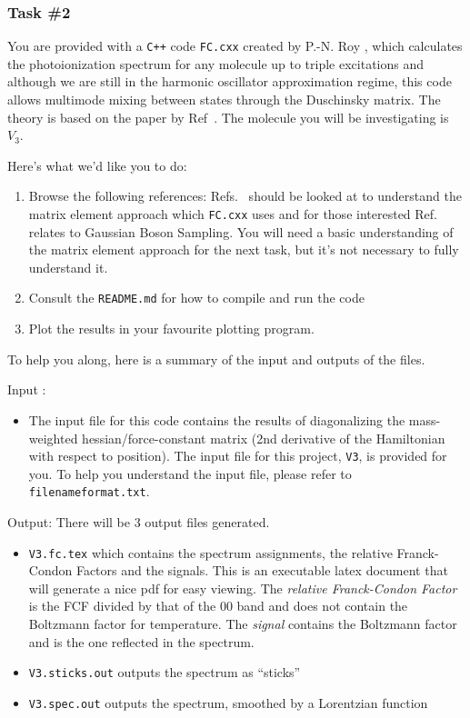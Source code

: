 \documentclass[12pt]{article}
\begin{document}
\subsubsection*{Task \#2}

You are provided with a \texttt{C++} code \texttt{FC.cxx} created by P.-N. Roy \cite{yang1995structure}, which calculates the photoionization spectrum for any molecule up to triple excitations and although we are still in the harmonic oscillator approximation regime, this code allows multimode mixing between states through the Duschinsky matrix. The theory is based on the paper by Ref~\cite{doktorov1977dynamical}. The molecule you will be investigating is $V_3$.

Here's what we'd like you to do:
\begin{enumerate}
    \item Browse the following references: Refs.~\cite{yang1995structure,jankowiak2007vibronic} should be looked at to understand the matrix element approach which \texttt{FC.cxx} uses and for those interested Ref.~\cite{quesadaFranckCondonFactorsCounting2019} relates to Gaussian Boson Sampling. You will need a basic understanding of the matrix element approach for the next task, but it's not necessary to fully understand it.
    \item Consult the \texttt{README.md} for how to compile and run the code
     \item Plot the results in your favourite plotting program. 
\end{enumerate}

\noindent To help you along, here is a summary of the input and outputs of the files.

\noindent Input :
\begin{itemize}
\item  The input file for this code contains the results of diagonalizing the mass-weighted hessian/force-constant matrix (2nd derivative of the Hamiltonian with respect to position). The input file for this project, \texttt{V3}, is provided for you. To help you understand the input file, please refer to \texttt{filenameformat.txt}. 
\end{itemize}

\noindent Output: There will be 3 output files generated. 
\begin{itemize}
\item  \texttt{V3.fc.tex} which contains the spectrum assignments, the relative Franck-Condon Factors and the signals. This is an executable latex document that will generate a nice pdf for easy viewing. The  {\it relative Franck-Condon Factor} is the FCF divided by that of the 00 band and does not contain the Boltzmann factor for temperature. The {\it signal} contains the Boltzmann factor and is the one reflected in the spectrum. 
\item \texttt{V3.sticks.out} outputs the spectrum as ``sticks''
\item \texttt{V3.spec.out} outputs the spectrum, smoothed by a Lorentzian function  
\end{itemize}
\end{document}
